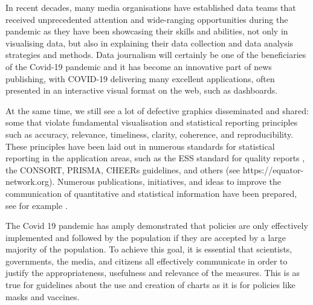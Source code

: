 \documentclass[article]{jdssv}\usepackage[]{graphicx}\usepackage[]{color}
\begin{document}
In recent decades, many media organisations have established data teams that received unprecedented attention and wide-ranging opportunities during the pandemic as they have been showcasing their skills and abilities, not only in visualising data, but also in explaining their data collection and data analysis strategies and methods. Data journalism will certainly be one of the beneficiaries of the Covid-19 pandemic and it has become an innovative part of news publishing, with COVID-19 delivering many excellent applications, often presented in an interactive visual format on the web, such as dashboards.


At the same time, we still see a lot of defective graphics disseminated and shared: some that violate fundamental visualisation and statistical reporting principles such as accuracy, relevance, timeliness, clarity, coherence, and reproducibility. These principles have been laid out in numerous standards for statistical reporting in the application areas, such as the ESS standard for quality reports \citep{ess2009}, the CONSORT, PRISMA, CHEERs guidelines, and others (see https://equator-network.org). Numerous publications, initiatives, and ideas to improve the communication of quantitative and statistical information have been prepared, see for example \cite{Hoffrage2261,Tufte2001,Rosling2011,otavamylona2020}.

The Covid 19 pandemic has amply demonstrated that policies are only effectively implemented and followed by the population if they are accepted by a large majority of the population. To achieve this goal, it is essential that scientists, governments, the media, and citizens all effectively communicate in order to justify the appropriateness, usefulness and relevance of the measures. This is as true for guidelines about the use and creation of charts as it is for policies like masks and vaccines. %
\end{document}
